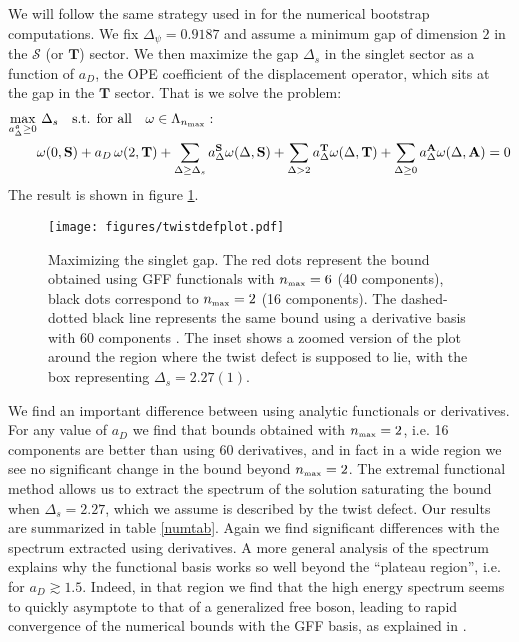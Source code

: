 \documentclass[12pt]{article}
\numberwithin{equation}{section}
\newcommand{\ba}{\begin{equation}\begin{aligned}}
\newcommand{\ea}{\end{aligned}\end{equation}}
\newcommand{\mbf}{\mathbf}
\def\D{\Delta}
\newcommand{\mf}[1]{\mathfrak #1}
\begin{document}
	We will follow the same strategy used in \cite{Gaiotto:2013nva} for the numerical bootstrap computations. We fix $\Delta_\psi=0.9187$ and assume a minimum gap of dimension $2$ in the $\mathcal{S}$ (or $\mbf T$) sector.  We then maximize the gap $\D_s$ in the singlet sector as a function of $a_D$, the OPE coefficient of the displacement operator, which sits at the gap in the $\mbf T$ sector. That is we solve the problem:\\
	\ba
	\underset{a_{\Delta}^{\mf a}\geq 0}{\mbox{max}}&\ \Delta_s \quad \mbox{s.t. for all} \quad \omega\in \Lambda_{n_{\mbox{\tiny max}}}:\\
	&\omega(0,\mbf S)+a_D\, \omega(2,\mbf T)+\sum_{\Delta\geq \Delta_s} a^{\mbf S}_\Delta \omega(\Delta,\mbf S)+\sum_{\Delta> 2} a^{\mbf T}_\Delta \omega(\Delta,\mbf T)+\sum_{\Delta\geq 0} a^{\mbf A}_\Delta \omega(\Delta,\mbf A)=0
	\ea
	The result is shown in figure \ref{fig:dgvsope}. 
	\begin{figure}
		\begin{center}
				\texttt{[image: figures/twistdefplot.pdf]}
			\caption{\label{fig:dgvsope} Maximizing the singlet gap. The red dots represent the bound obtained using GFF functionals with $n_{\mbox{\tiny max}}=6$ (40 components), black dots correspond to $n_{\mbox{\tiny max}}=2$ (16 components). The dashed-dotted black line represents the same bound using a derivative basis with 60 components \cite{Gaiotto:2013nva}. The inset shows a zoomed version of the plot around the region where the twist defect is supposed to lie, with the box representing $\Delta_s=2.27(1)$.}
		\end{center}
	\end{figure}
	We find an important difference between using analytic functionals or derivatives. For any value of $a_{D}$ we find that bounds obtained with $n_{\mbox{\tiny max}}=2$, i.e. 16 components are better than using 60 derivatives, and in fact in a wide region we see no significant change in the bound beyond  $n_{\mbox{\tiny max}}=2$. The extremal functional method \cite{El-Showk:2016mxr} allows us to extract the spectrum of the solution saturating the bound when $\Delta_s=2.27$, which we assume is described by the twist defect. Our results are summarized in table \ref{numtab}. Again we find significant differences with the spectrum extracted using derivatives. A more general analysis of the spectrum explains why the functional basis works so well beyond the ``plateau region'', i.e. for $a_D\gtrsim 1.5$. Indeed, in that region we find that the high energy spectrum seems to quickly asymptote to that of a generalized free boson, leading to rapid convergence of the numerical bounds with the GFF basis, as explained in \cite{Paulos:2019fkw}.
	
\end{document}
